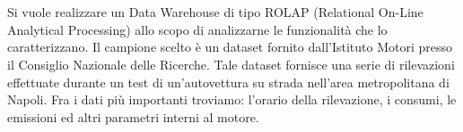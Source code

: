 \chapter*{}
Si vuole realizzare un Data Warehouse di tipo ROLAP (Relational On-Line Analytical Processing) allo scopo di analizzarne le funzionalità che lo caratterizzano. Il campione scelto è un dataset fornito dall’Istituto Motori presso il Consiglio Nazionale delle Ricerche. Tale dataset fornisce una serie di rilevazioni effettuate durante un test di un’autovettura su strada nell’area metropolitana di Napoli. Fra i dati più importanti troviamo: l’orario della rilevazione, i consumi, le emissioni ed altri parametri interni al motore.